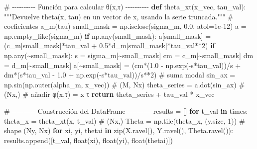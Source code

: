 \documentclass[
  spanish,
  us-letterpaper,
]{scrreprt}
\newenvironment{Shaded}{\begin{snugshade}}{\end{snugshade}}
\newcommand{\BuiltInTok}[1]{\textcolor[rgb]{0.00,0.23,0.31}{#1}}
\newcommand{\CommentTok}[1]{\textcolor[rgb]{0.37,0.37,0.37}{#1}}
\newcommand{\ControlFlowTok}[1]{\textcolor[rgb]{0.00,0.23,0.31}{\textbf{#1}}}
\newcommand{\DecValTok}[1]{\textcolor[rgb]{0.68,0.00,0.00}{#1}}
\newcommand{\FloatTok}[1]{\textcolor[rgb]{0.68,0.00,0.00}{#1}}
\newcommand{\KeywordTok}[1]{\textcolor[rgb]{0.00,0.23,0.31}{\textbf{#1}}}
\newcommand{\NormalTok}[1]{\textcolor[rgb]{0.00,0.23,0.31}{#1}}
\newcommand{\OperatorTok}[1]{\textcolor[rgb]{0.37,0.37,0.37}{#1}}
\theoremstyle{definition}
\theoremstyle{plain}
\theoremstyle{remark}
\begin{document}
\begin{Shaded}
\begin{Highlighting}[]
\CommentTok{\# {-}{-}{-}{-}{-}{-}{-}{-}{-}{-} Función para calcular θ(x,τ) {-}{-}{-}{-}{-}{-}{-}{-}{-}{-}}
\KeywordTok{def}\NormalTok{ theta\_xt(x\_vec, tau\_val):}
    \CommentTok{"""Devuelve theta(x, tau) en un vector de x,}
\CommentTok{    usando la serie truncada."""}
    \CommentTok{\# coeficientes a\_m(tau)}
\NormalTok{    small\_mask }\OperatorTok{=}\NormalTok{ np.isclose(sigma\_m, }\FloatTok{0.0}\NormalTok{, atol}\OperatorTok{=}\FloatTok{1e{-}12}\NormalTok{)}
\NormalTok{    a }\OperatorTok{=}\NormalTok{ np.empty\_like(sigma\_m)}
    \ControlFlowTok{if}\NormalTok{ np.}\BuiltInTok{any}\NormalTok{(small\_mask):}
\NormalTok{        a[small\_mask] }\OperatorTok{=}\NormalTok{ (c\_m[small\_mask]}\OperatorTok{*}\NormalTok{tau\_val }
        \OperatorTok{+} \FloatTok{0.5}\OperatorTok{*}\NormalTok{d\_m[small\_mask]}\OperatorTok{*}\NormalTok{tau\_val}\OperatorTok{**}\DecValTok{2}\NormalTok{)}
    \ControlFlowTok{if}\NormalTok{ np.}\BuiltInTok{any}\NormalTok{(}\OperatorTok{\textasciitilde{}}\NormalTok{small\_mask):}
\NormalTok{        s }\OperatorTok{=}\NormalTok{ sigma\_m[}\OperatorTok{\textasciitilde{}}\NormalTok{small\_mask]}
\NormalTok{        cm }\OperatorTok{=}\NormalTok{ c\_m[}\OperatorTok{\textasciitilde{}}\NormalTok{small\_mask]}
\NormalTok{        dm }\OperatorTok{=}\NormalTok{ d\_m[}\OperatorTok{\textasciitilde{}}\NormalTok{small\_mask]}
\NormalTok{        a[}\OperatorTok{\textasciitilde{}}\NormalTok{small\_mask] }\OperatorTok{=}\NormalTok{ (cm}\OperatorTok{*}\NormalTok{(}\FloatTok{1.0} \OperatorTok{{-}}\NormalTok{ np.exp(}\OperatorTok{{-}}\NormalTok{s}\OperatorTok{*}\NormalTok{tau\_val))}\OperatorTok{/}\NormalTok{s }
        \OperatorTok{+}\NormalTok{ dm}\OperatorTok{*}\NormalTok{(s}\OperatorTok{*}\NormalTok{tau\_val }\OperatorTok{{-}} \FloatTok{1.0} 
        \OperatorTok{+}\NormalTok{ np.exp(}\OperatorTok{{-}}\NormalTok{s}\OperatorTok{*}\NormalTok{tau\_val))}\OperatorTok{/}\NormalTok{s}\OperatorTok{**}\DecValTok{2}\NormalTok{)}
    \CommentTok{\# suma modal}
\NormalTok{    sin\_ax }\OperatorTok{=}\NormalTok{ np.sin(np.outer(alpha\_m, x\_vec))   }\CommentTok{\# (M, Nx)}
\NormalTok{    theta\_series }\OperatorTok{=}\NormalTok{ a.dot(sin\_ax)                }\CommentTok{\# (Nx,)}
    \CommentTok{\# añadir φ(x,τ) = x τ}
    \ControlFlowTok{return}\NormalTok{ theta\_series }\OperatorTok{+}\NormalTok{ tau\_val }\OperatorTok{*}\NormalTok{ x\_vec}

\CommentTok{\# {-}{-}{-}{-}{-}{-}{-}{-}{-}{-} Construcción del DataFrame {-}{-}{-}{-}{-}{-}{-}{-}{-}{-}}
\NormalTok{results }\OperatorTok{=}\NormalTok{ []}
\ControlFlowTok{for}\NormalTok{ t\_val }\KeywordTok{in}\NormalTok{ times:}
\NormalTok{    theta\_x }\OperatorTok{=}\NormalTok{ theta\_xt(x, t\_val)         }\CommentTok{\# (Nx,)}
\NormalTok{    Theta }\OperatorTok{=}\NormalTok{ np.tile(theta\_x, (y.size, }\DecValTok{1}\NormalTok{))  }\CommentTok{\# shape (Ny, Nx)}
    \ControlFlowTok{for}\NormalTok{ xi, yi, thetai }\KeywordTok{in} \BuiltInTok{zip}\NormalTok{(X.ravel(), Y.ravel(), Theta.ravel()):}
\NormalTok{        results.append([t\_val, }\BuiltInTok{float}\NormalTok{(xi), }\BuiltInTok{float}\NormalTok{(yi), }\BuiltInTok{float}\NormalTok{(thetai)])}


\end{Highlighting}
\end{Shaded}
\end{document}
